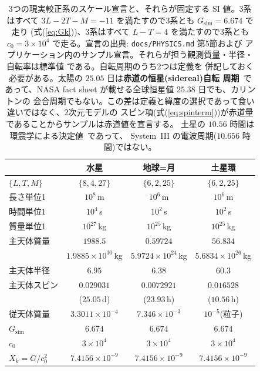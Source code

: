 \documentclass[a4paper,10pt,twocolumn]{ltjsarticle}
\begin{document}
\begin{table}[t]
\centering
\caption{3つの現実較正系のスケール宣言と、それらが固定する SI 値。3系はすべて
  $3L-2T-M=-11$ を満たすので3系とも $G_{\mathrm{sim}}=6.674$ で走り
  (式(\ref{eq:Gk}))、3系はすべて $L-T=4$ を満たすので3系とも
  $c_0=3\times10^{4}$ で走る。宣言の出典: \texttt{docs/PHYSICS.md} 第5節および
  アプリケーション内のサンプル宣言。それらが担う観測質量・半径・自転率は標準値
  \cite{Prsa2016,NASAFact,Mankovich2019} である。自転周期のうち2つは定義を
  併記しておく必要がある。太陽の $25.05$ 日は\textbf{赤道の恒星(sidereal)自転
  周期}~\cite{SnodgrassUlrich1990}であって、NASA fact sheet が載せる全球恒星値
  $25.38$ 日でも、カリントンの
  会合周期でもない。この差は定義と緯度の選択であって食い違いではなく、2次元モデルの
  スピン項(式(\ref{eq:spinterm}))が赤道量であることからサンプルは赤道値を宣言する。
  土星の $10.56$ 時間は環震学による決定値~\cite{Mankovich2019}であって、
  System~III の電波周期($10.656$ 時間)ではない。}
\label{tab:scales}
\begin{tabular}{lccc}
\toprule
 & 水星 & 地球=月 & 土星環 \\
\midrule
$\{L,T,M\}$ & $\{8,4,27\}$ & $\{6,2,25\}$ & $\{6,2,25\}$ \\
長さ単位1 & $10^{8}$\,m & $10^{6}$\,m & $10^{6}$\,m \\
時間単位1 & $10^{4}$\,s & $10^{2}$\,s & $10^{2}$\,s \\
質量単位1 & $10^{27}$\,kg & $10^{25}$\,kg & $10^{25}$\,kg \\
主天体質量 & $1988.5$ & $0.59724$ & $56.834$ \\
 & $1.9885{\times}10^{30}$\,kg & $5.9724{\times}10^{24}$\,kg
 & $5.6834{\times}10^{26}$\,kg \\
主天体半径 & $6.95$ & $6.38$ & $60.3$ \\
主天体スピン & $0.029031$ & $0.0072921$ & $0.016528$ \\
 & ($25.05$\,d) & ($23.93$\,h) & ($10.56$\,h) \\
従天体質量 & $3.3011{\times}10^{-4}$ & $7.346{\times}10^{-3}$
 & $10^{-5}$(粒子) \\
$G_{\mathrm{sim}}$ & $6.674$ & $6.674$ & $6.674$ \\
$c_0$ & $3{\times}10^{4}$ & $3{\times}10^{4}$ & $3{\times}10^{4}$ \\
$X_k=G/c_0^{2}$ & $7.4156{\times}10^{-9}$ & $7.4156{\times}10^{-9}$
 & $7.4156{\times}10^{-9}$ \\
\bottomrule
\end{tabular}
\end{table}
\end{document}
